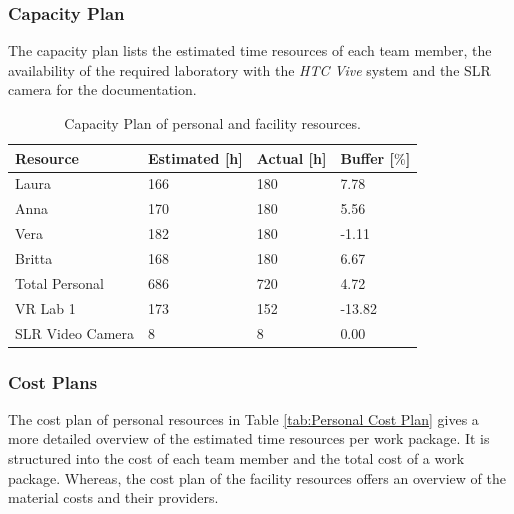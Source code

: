 \subsubsection{Capacity Plan}\label{sec:PMCapacity Plan}

The capacity plan lists the estimated time resources of each team member, the availability of the required laboratory with the \textit{HTC Vive} system and the SLR camera for the documentation.
\begin{table}[H]
	\centering
	\begin{tabular}{|l|l|l|l|}
		\hline
		\Absatzbox{}
		\textbf{Resource} &	\textbf{ Estimated [h]} &	\textbf{Actual [h]} & 	\textbf{Buffer [$\%$]}\\ \hline
		Laura &	166 &	180	& 7.78\\ \hline
		Anna&	170	&180&	5.56\\ \hline
		Vera&	182	&180&	-1.11\\ \hline
		Britta&	168&	180	&6.67\\ \hline
		Total Personal&	686	&720&	4.72\\ \hline
		VR Lab 1&	173&	152&	-13.82\\ \hline
		SLR Video Camera&	8&	8&	0.00\\ \hline
	\end{tabular}
	\caption[]{Capacity Plan of personal and facility resources.}
	\label{tab:Capacity Plan}
\end{table}

\subsubsection{Cost Plans}\label{sec:PMCostPlan}

The cost plan of personal resources in Table \ref{tab:Personal Cost Plan} gives a more detailed overview of the estimated time resources per work package. It is structured into the cost of each team member and the total cost of a work package. Whereas, the cost plan of the facility resources offers an overview of the material costs and their providers.

